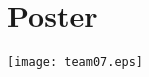 \section{Poster}
\newpage
\vfill
\begin{sidewaysfigure}[ht]
\texttt{[image: team07.eps]}
\end{sidewaysfigure}
\vfill
\clearpage

